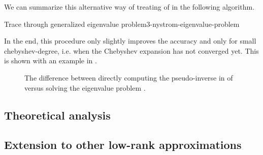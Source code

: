 
We can summarize this alternative way of treating
 of 
in the following algorithm.
\begin{algo}{Trace through generalized eigenvalue problem}{3-nystrom-eigenvalue-problem}
    
\end{algo}

In the end, this procedure only slightly improves the accuracy
and only for small \gls{chebyshev-degree}, i.e. when the Chebyshev expansion has
not converged yet. This is shown with an example in .

\begin{figure}[ht]
    \centering
    
    \caption{The difference between directly computing the pseudo-inverse
        in  of 
        versus solving the eigenvalue problem .}
    \label{fig:3-nystrom-eigenvalue-problem}
\end{figure}



\subsection{Theoretical analysis}
\label{subsec:3-nystrom-theoretical-analysis}



\subsection{Extension to other low-rank approximations}
\label{subsec:3-nystrom-other-low-rank}

